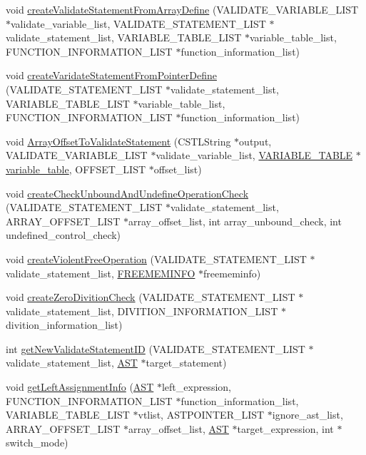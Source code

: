 \begin{DoxyCompactItemize}
\item 
void \hyperlink{Varidate__statement_8h_a5298c5a01af1005ed5c45cd86b162d70}{createValidateStatementFromArrayDefine} (VALIDATE\_\-VARIABLE\_\-LIST $\ast$validate\_\-variable\_\-list, VALIDATE\_\-STATEMENT\_\-LIST $\ast$validate\_\-statement\_\-list, VARIABLE\_\-TABLE\_\-LIST $\ast$variable\_\-table\_\-list, FUNCTION\_\-INFORMATION\_\-LIST $\ast$function\_\-information\_\-list)
\item 
void \hyperlink{Varidate__statement_8h_aedc6997524037e82fb5a1a4512258981}{createVaridateStatementFromPointerDefine} (VALIDATE\_\-STATEMENT\_\-LIST $\ast$validate\_\-statement\_\-list, VARIABLE\_\-TABLE\_\-LIST $\ast$variable\_\-table\_\-list, FUNCTION\_\-INFORMATION\_\-LIST $\ast$function\_\-information\_\-list)
\item 
void \hyperlink{Varidate__statement_8h_abb2441e28fddfef1552333a44d678966}{ArrayOffsetToValidateStatement} (CSTLString $\ast$output, VALIDATE\_\-VARIABLE\_\-LIST $\ast$validate\_\-variable\_\-list, \hyperlink{structvariable__table}{VARIABLE\_\-TABLE} $\ast$\hyperlink{structvariable__table}{variable\_\-table}, OFFSET\_\-LIST $\ast$offset\_\-list)
\item 
void \hyperlink{Varidate__statement_8h_a3d74e67ba9ec148d7efaba480d179c3b}{createCheckUnboundAndUndefineOperationCheck} (VALIDATE\_\-STATEMENT\_\-LIST $\ast$validate\_\-statement\_\-list, ARRAY\_\-OFFSET\_\-LIST $\ast$array\_\-offset\_\-list, int array\_\-unbound\_\-check, int undefined\_\-control\_\-check)
\item 
void \hyperlink{Varidate__statement_8h_aafb03c83a3e230546b0798459097e566}{createViolentFreeOperation} (VALIDATE\_\-STATEMENT\_\-LIST $\ast$validate\_\-statement\_\-list, \hyperlink{structfreemem__info}{FREEMEMINFO} $\ast$freememinfo)
\item 
void \hyperlink{Varidate__statement_8h_a722a526669b1786c0ee311f742fcab5e}{createZeroDivitionCheck} (VALIDATE\_\-STATEMENT\_\-LIST $\ast$validate\_\-statement\_\-list, DIVITION\_\-INFORMATION\_\-LIST $\ast$divition\_\-information\_\-list)
\item 
int \hyperlink{Varidate__statement_8h_a67a425d9c80a11752fea1c09e02c37c8}{getNewValidateStatementID} (VALIDATE\_\-STATEMENT\_\-LIST $\ast$validate\_\-statement\_\-list, \hyperlink{structabstract__syntax__tree}{AST} $\ast$target\_\-statement)
\item 
void \hyperlink{Varidate__statement_8h_ad7d1ad81f81f0780527904c6dc144cc2}{getLeftAssignmentInfo} (\hyperlink{structabstract__syntax__tree}{AST} $\ast$left\_\-expression, FUNCTION\_\-INFORMATION\_\-LIST $\ast$function\_\-information\_\-list, VARIABLE\_\-TABLE\_\-LIST $\ast$vtlist, ASTPOINTER\_\-LIST $\ast$ignore\_\-ast\_\-list, ARRAY\_\-OFFSET\_\-LIST $\ast$array\_\-offset\_\-list, \hyperlink{structabstract__syntax__tree}{AST} $\ast$target\_\-expression, int $\ast$switch\_\-mode)

\end{DoxyCompactItemize}
